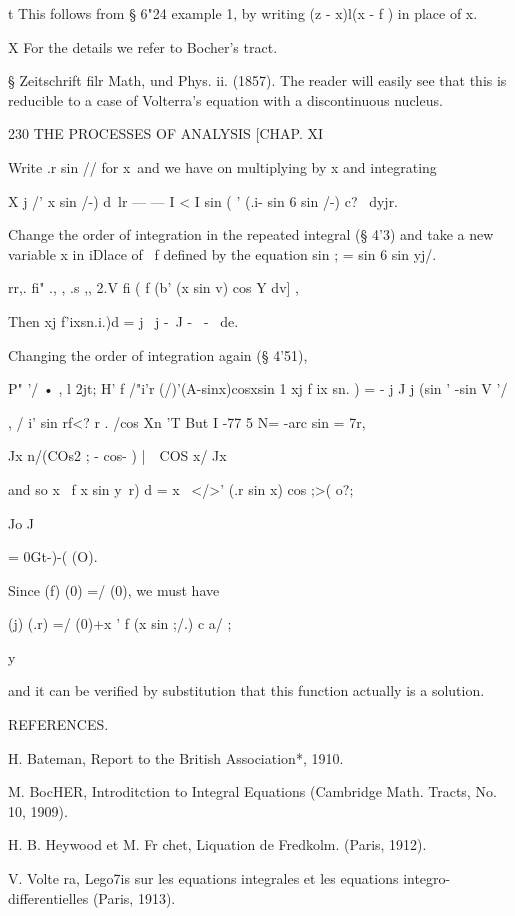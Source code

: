 {t This follows from § 6"24 example 1, by writing (z - x)l(x - f ) in
place of x.

X For the details we refer to Bocher's tract.

§ Zeitschrift filr Math, und Phys. ii. (1857). The reader will easily
see that this is reducible to a case of Volterra's equation with a
discontinuous nucleus.



230 THE PROCESSES OF ANALYSIS [CHAP. XI

Write .r sin // for x\ and we have on multiplying by x and integrating

X j /' x sin \//-) d\ lr — — I < I sin ( ' (.i- sin 6 sin \//-) c? \
dyjr.

Change the order of integration in the repeated integral (§ 4'3) and
take a new variable x in iDlace of \ f defined by the equation sin ; =
sin 6 sin yj/.

rr,. fi" ., , .s ,, 2.V fi ( f (b' (x sin v) cos Y dv] ,

Then xj f'ixsn.i.)d = j \ j -~J -~ - \ de.

Changing the order of integration again (§ 4'51),

P" '/ • , l 2jt; H' f /"i'r (/)'(A-sinx)cosxsin 1 xj f ix sn. ) = - j
J j \/(sin ' -sin V '/

  , / i' sin rf<? r . /cos Xn 'T But I -77 5 N= -arc sin = 7r,

Jx n/(COs2 ; - cos- ) |\ \ COS x/ Jx

and so x \ f x sin y\ r) d = x \ </>' (.r sin x) cos ;>( o?;

Jo J

= 0Gt-)-( (O).

Since (f) (0) =/ (0), we must have

(j) (.r) =/ (0)+x ' f (x sin ;/.) c a/ ;

y

and it can be verified by substitution that this function actually is
a solution.



REFERENCES.

H. Bateman, Report to the British Association*, 1910.

M. BocHER, Introditction to Integral Equations (Cambridge Math.
Tracts, No. 10, 1909).

H. B. Heywood et M. Fr chet, Liquation de Fredkolm. (Paris, 1912).

V. Volte ra, Lego7is sur les equations integrales et les equations
integro-differentielles (Paris, 1913).

}
